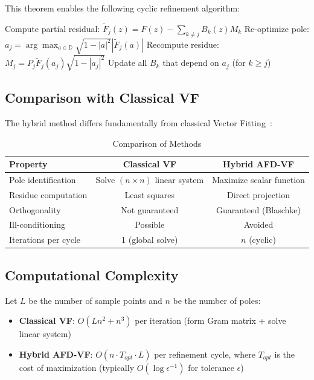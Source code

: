 \documentclass[journal]{IEEEtran}%
\begin{document}
This theorem enables the following cyclic refinement algorithm:

\begin{algorithm}[H]
\caption{Cyclic Refinement (No Least Squares)}
\begin{algorithmic}
\Repeat
        \State Compute partial residual: $\tilde{F}_j(z) = F(z) - \sum_{k \neq j} B_k(z)M_k$
        \State Re-optimize pole: $a_j = \arg\max_{a \in \mathbb{D}} \sqrt{1-|a|^2}|\tilde{F}_j(a)|$
        \State Recompute residue: $M_j = P_j \tilde{F}_j(a_j)\sqrt{1-|a_j|^2}$
        \State Update all $B_k$ that depend on $a_j$ (for $k \geq j$)
    \EndFor
{}
\end{algorithmic}
\end{algorithm}

\subsection{Comparison with Classical VF}

The hybrid method differs fundamentally from classical Vector Fitting~\cite{gustavsen1999rational}:

\begin{table}[h]
\centering
\caption{Comparison of Methods}
\begin{tabular}{lcc}
\toprule
Property & Classical VF & Hybrid AFD-VF \\
\midrule
Pole identification & Solve $(n \times n)$ linear system & Maximize scalar function \\
Residue computation & Least squares & Direct projection \\
Orthogonality & Not guaranteed & Guaranteed (Blaschke) \\
Ill-conditioning & Possible & Avoided \\
Iterations per cycle & 1 (global solve) & $n$ (cyclic) \\
\bottomrule
\end{tabular}
\end{table}

\subsection{Computational Complexity}

Let $L$ be the number of sample points and $n$ be the number of poles:
\begin{itemize}
  \item \textbf{Classical VF}: $O(L n^2 + n^3)$ per iteration (form Gram matrix + solve linear system)
  \item \textbf{Hybrid AFD-VF}: $O(n \cdot T_{opt} \cdot L)$ per refinement cycle, where $T_{opt}$ is the cost of maximization (typically $O(\log \epsilon^{-1})$ for tolerance $\epsilon$)
\end{itemize}
\end{document}
